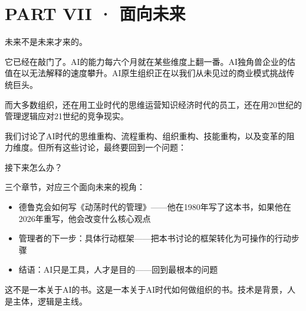 \part{PART VII · 面向未来}



未来不是未来才来的。

它已经在敲门了。AI的能力每六个月就在某些维度上翻一番。AI独角兽企业的估值在以无法解释的速度攀升。AI原生组织正在以我们从未见过的商业模式挑战传统巨头。

而大多数组织，还在用工业时代的思维运营知识经济时代的员工，还在用20世纪的管理逻辑应对21世纪的竞争现实。

我们讨论了AI时代的思维重构、流程重构、组织重构、技能重构，以及变革的阻力维度。但所有这些讨论，最终要回到一个问题：

接下来怎么办？

三个章节，对应三个面向未来的视角：
\begin{itemize}
\item 德鲁克会如何写《动荡时代的管理》——他在1980年写了这本书，如果他在2026年重写，他会改变什么核心观点
\item 管理者的下一步：具体行动框架——把本书讨论的框架转化为可操作的行动步骤
\item 结语：AI只是工具，人才是目的——回到最根本的问题

\end{itemize}
这不是一本关于AI的书。这是一本关于AI时代如何做组织的书。技术是背景，人是主体，逻辑是主线。
